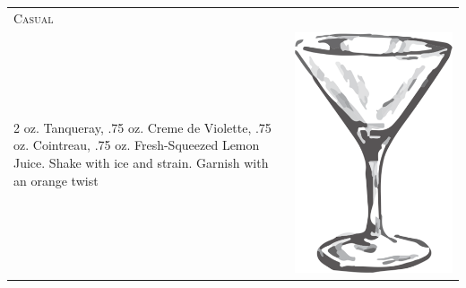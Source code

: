 \documentclass{article}
\begin{document}
\begin{tabular}{p{2in} p{0.5in}}
\multicolumn{2}{p{3in}}{\centering\Huge\textsc{Casual}}\\ 
  \vspace{-0.1in}2 oz. Tanqueray, .75 oz. Creme de Violette, .75 oz. Cointreau, .75 oz. Fresh-Squeezed Lemon Juice. Shake with ice and strain. Garnish with an orange twist &
  \vspace{-0.1in} \includegraphics{goblet.png}
\end{tabular}
\end{document}
